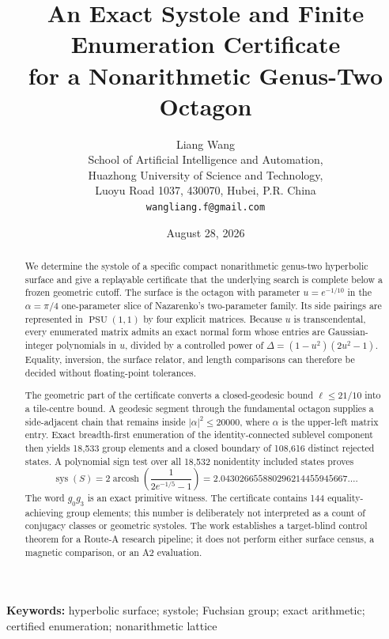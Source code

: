 \documentclass[11pt,a4paper]{article}
\title{An Exact Systole and Finite Enumeration Certificate\\
for a Nonarithmetic Genus-Two Octagon}
\author{Liang Wang\\
\small School of Artificial Intelligence and Automation,\\
\small Huazhong University of Science and Technology,\\
\small Luoyu Road 1037, 430070, Hubei, P.R. China\\
\small \texttt{wangliang.f@gmail.com}}
\date{August 28, 2026}
\theoremstyle{definition}
\newcommand{\PSU}{\operatorname{PSU}}
\newcommand{\arcosh}{\operatorname{arcosh}}
\newcommand{\sys}{\operatorname{sys}}
\newcommand{\length}{\ell}
\begin{document}
\maketitle

\begin{abstract}
We determine the systole of a specific compact nonarithmetic genus-two
hyperbolic surface and give a replayable certificate that the underlying
search is complete below a frozen geometric cutoff.  The surface is the
octagon with parameter \(u=e^{-1/10}\) in the \(\alpha=\pi/4\)
one-parameter slice of Nazarenko's two-parameter family.
Its side pairings are represented in \(\PSU(1,1)\) by four explicit matrices.
Because \(u\) is transcendental, every enumerated matrix admits an exact
normal form whose entries are Gaussian-integer polynomials in \(u\), divided
by a controlled power of
\(\Delta=(1-u^2)(2u^2-1)\).  Equality, inversion, the surface relator, and
length comparisons can therefore be decided without floating-point
tolerances.

The geometric part of the certificate converts a closed-geodesic bound
\(\length\leq21/10\) into a tile-centre bound.  A geodesic segment through the
fundamental octagon supplies a side-adjacent chain that remains inside
\(\lvert\alpha\rvert^2\leq20000\), where \(\alpha\) is the upper-left matrix
entry.  Exact breadth-first enumeration of the identity-connected sublevel
component then yields 18,533 group elements and a closed boundary of 108,616
distinct rejected states.  A polynomial sign test over all 18,532
nonidentity included states proves
\[
  \sys(S)=2\arcosh\!\left(\frac{1}{2e^{-1/5}-1}\right)
  =2.043026655880296214455945667\ldots .
\]
The word \(g_0g_3\) is an exact primitive witness.  The certificate contains
144 equality-achieving group elements; this number is deliberately not
interpreted as a count of conjugacy classes or geometric systoles.  The work
establishes a target-blind control theorem for a Route-A research pipeline;
it does not perform either surface census, a magnetic comparison, or an A2
evaluation.
\end{abstract}

\noindent\textbf{Keywords:} hyperbolic surface; systole; Fuchsian group;
exact arithmetic; certified enumeration; nonarithmetic lattice
\end{document}
